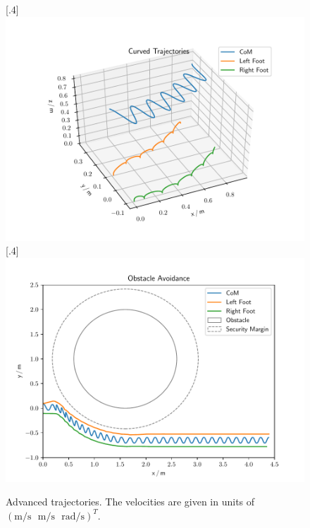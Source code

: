 \begin{figure}[h]
	\centering
	[.4\linewidth]{\includegraphics[scale=.35]{chapters/05_experiments/01_user_controlled_walking/01_benchmarking/nmpc_turn.pdf}}
	[.4\linewidth]{\includegraphics[scale=.35]{chapters/05_experiments/01_user_controlled_walking/01_benchmarking/nmpc_obstacle.pdf}}
	\caption{Advanced trajectories. The velocities are given in units of\\$(\text{m}/\text{s}\,\,\,\,\text{m}/\text{s}\,\,\,\,\text{rad}/\text{s})^T$.}
	\label{fig::511_benchmarking_advanced}
\end{figure} 
